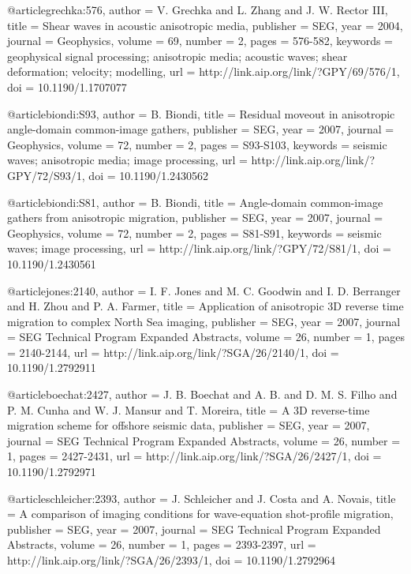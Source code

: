 {@article{grechka:576,
  author =	 {V. Grechka and L. Zhang and J.
                  W. Rector III},
  title =	 {Shear waves in acoustic anisotropic media},
  publisher =	 {SEG},
  year =	 2004,
  journal =	 {Geophysics},
  volume =	 69,
  number =	 2,
  pages =	 {576-582},
  keywords =	 {geophysical signal processing; anisotropic media;
                  acoustic waves; shear deformation; velocity;
                  modelling},
  url =		 {http://link.aip.org/link/?GPY/69/576/1},
  doi =		 {10.1190/1.1707077}
}

@article{biondi:S93,
  author =	 {B. Biondi},
  title =	 {Residual moveout in anisotropic angle-domain
                  common-image gathers},
  publisher =	 {SEG},
  year =	 2007,
  journal =	 {Geophysics},
  volume =	 72,
  number =	 2,
  pages =	 {S93-S103},
  keywords =	 {seismic waves; anisotropic media; image processing},
  url =		 {http://link.aip.org/link/?GPY/72/S93/1},
  doi =		 {10.1190/1.2430562}
}

@article{biondi:S81,
  author =	 {B. Biondi},
  title =	 {Angle-domain common-image gathers from anisotropic
                  migration},
  publisher =	 {SEG},
  year =	 2007,
  journal =	 {Geophysics},
  volume =	 72,
  number =	 2,
  pages =	 {S81-S91},
  keywords =	 {seismic waves; image processing},
  url =		 {http://link.aip.org/link/?GPY/72/S81/1},
  doi =		 {10.1190/1.2430561}
}

@article{jones:2140,
  author =	 {I. F. Jones and M. C. Goodwin and I. D. Berranger
                  and H. Zhou and P. A. Farmer},
  title =	 {Application of anisotropic {3D} reverse time
                  migration to complex {N}orth {S}ea imaging},
  publisher =	 {SEG},
  year =	 2007,
  journal =	 {SEG Technical Program Expanded Abstracts},
  volume =	 26,
  number =	 1,
  pages =	 {2140-2144},
  url =		 {http://link.aip.org/link/?SGA/26/2140/1},
  doi =		 {10.1190/1.2792911}
}

@article{boechat:2427,
  author =	 {J. B. Boechat and A. B.
                  and D. M. S. Filho and P. M. Cunha and
                  W. J. Mansur and T. Moreira},
  title =	 {A {3D} reverse-time migration scheme for offshore
                  seismic data},
  publisher =	 {SEG},
  year =	 2007,
  journal =	 {SEG Technical Program Expanded Abstracts},
  volume =	 26,
  number =	 1,
  pages =	 {2427-2431},
  url =		 {http://link.aip.org/link/?SGA/26/2427/1},
  doi =		 {10.1190/1.2792971}
}

@article{schleicher:2393,
  author =	 {J. Schleicher and J. Costa and
                  A. Novais},
  title =	 {A comparison of imaging conditions for wave-equation
                  shot-profile migration},
  publisher =	 {SEG},
  year =	 2007,
  journal =	 {SEG Technical Program Expanded Abstracts},
  volume =	 26,
  number =	 1,
  pages =	 {2393-2397},
  url =		 {http://link.aip.org/link/?SGA/26/2393/1},
  doi =		 {10.1190/1.2792964}
}

}
